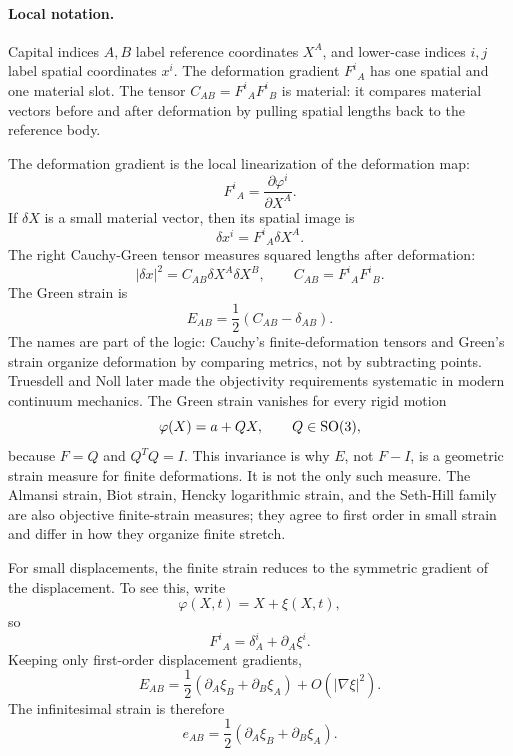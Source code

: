 \paragraph{Local notation.}
Capital indices \(A,B\) label reference coordinates \(X^A\), and lower-case
indices \(i,j\) label spatial coordinates \(x^i\).  The deformation gradient
\(F^i{}_A\) has one spatial and one material slot.  The tensor
\(C_{AB}=F^i{}_AF^i{}_B\) is material: it compares material vectors before
and after deformation by pulling spatial lengths back to the reference body.

The deformation gradient is the local linearization of the deformation map:
\[
  F^i{}_A=\frac{\partial \varphi^i}{\partial X^A}.
\]
If \(\delta X\) is a small material vector, then its spatial image is
\[
  \delta x^i=F^i{}_A\delta X^A.
\]
The right Cauchy-Green tensor measures squared lengths after deformation:
\[
  |\delta x|^2
  =
  C_{AB}\delta X^A\delta X^B,
  \qquad
  C_{AB}=F^i{}_AF^i{}_B.
\]
The Green strain is
\[
  E_{AB}=\frac12(C_{AB}-\delta_{AB}).
\]
The names are part of the logic: Cauchy's finite-deformation tensors and
Green's strain organize deformation by comparing metrics, not by subtracting
points. Truesdell and Noll later made the objectivity requirements systematic
in modern continuum mechanics. The Green strain vanishes for every rigid motion
\[
  \varphi(X)=a+QX,\qquad Q\in\operatorname{SO}(3),
\]
because \(F=Q\) and \(Q^TQ=I\). This invariance is why \(E\), not \(F-I\), is a
geometric strain measure for finite deformations. It is not the only such
measure. The Almansi strain, Biot strain, Hencky logarithmic strain, and the
Seth-Hill family are also objective finite-strain measures; they agree to first
order in small strain and differ in how they organize finite stretch.

For small displacements, the finite strain reduces to the symmetric gradient
of the displacement. To see this, write
\[
  \varphi(X,t)=X+\xi(X,t),
\]
so
\[
  F^i{}_A=\delta^i_A+\partial_A\xi^i.
\]
Keeping only first-order displacement gradients,
\[
  E_{AB}
  =
  \frac12(\partial_A\xi_B+\partial_B\xi_A)
  +
  O(|\nabla\xi|^2).
\]
The infinitesimal strain is therefore
\[
  \boxed{
  e_{AB}=\frac12(\partial_A\xi_B+\partial_B\xi_A).
  }
\]

